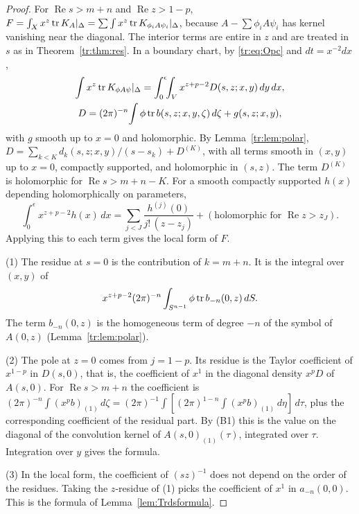 \begin{proof}
For \(\operatorname{Re}s>m+n\) and \(\operatorname{Re}z>1-p\),
\(F=\int_Xx^z\operatorname{tr} K_{A}|_\Delta=\sum\int x^z\operatorname{tr} K_{\phi_iA\psi_i}|_\Delta\),
because \(A-\sum\phi_iA\psi_i\) has kernel vanishing near the diagonal. The
interior terms are entire in \(z\) and are treated in \(s\) as in
Theorem~\ref{tr:thm:res}. In a boundary chart, by \eqref{tr:eq:Opc} and
\(dt=x^{-2}dx\),
\begin{gather*}
 \int x^z\operatorname{tr} K_{\phi A\psi}|_\Delta=\int_0^\epsilon\!\!\int_Vx^{z+p-2}
 D(s,z;x,y)\,dy\,dx,\\
 D=(2\pi)^{-n}\!\int\phi\operatorname{tr} b(s,z;x,y,\zeta)\,d\zeta+g(s,z;x,y),
\end{gather*}
with \(g\) smooth up to \(x=0\) and holomorphic. By
Lemma~\ref{tr:lem:polar}, \(D=\sum_{k<K}d_k(s,z;x,y)/(s-s_k)+D^{(K)}\), with
all terms smooth in \((x,y)\) up to \(x=0\), compactly supported, and
holomorphic in \((s,z)\). The term \(D^{(K)}\) is holomorphic for
\(\operatorname{Re}s>m+n-K\). For a smooth compactly supported \(h(x)\)
depending holomorphically on parameters,
\[
 \int_0^\epsilon x^{z+p-2}h(x)\,dx=\sum_{j<J}\frac{h^{(j)}(0)}{j!\,(z-z_j)}
 +(\text{holomorphic for }\operatorname{Re}z>z_J).
\]
Applying this to each term gives the local form of \(F\).

(1) The residue at \(s=0\) is the contribution of \(k=m+n\). It is the
integral over \((x,y)\) of
\[
 x^{z+p-2}(2\pi)^{-n}\int_{S^{n-1}}\phi\operatorname{tr} b_{-n}(0,z)\,dS .
\]
The term \(b_{-n}(0,z)\) is the homogeneous term of degree \(-n\) of the
symbol of \(A(0,z)\) (Lemma~\ref{tr:lem:polar}).

(2) The pole at \(z=0\) comes from \(j=1-p\). Its residue is the Taylor
coefficient of \(x^{1-p}\) in \(D(s,0)\), that is, the coefficient of
\(x^1\) in the diagonal density \(x^pD\) of \(A(s,0)\). For
\(\operatorname{Re}s>m+n\) the coefficient is
\((2\pi)^{-n}\int(x^pb)_{(1)}\,d\zeta=(2\pi)^{-1}\int[(2\pi)^{1-n}\int
(x^pb)_{(1)}\,d\eta]\,d\tau\), plus the corresponding coefficient of the
residual part. By (B1) this is the value on the diagonal of the convolution
kernel of \(A(s,0)_{(1)}(\tau)\), integrated over \(\tau\). Integration over
\(y\) gives the formula.

(3) In the local form, the coefficient of \((sz)^{-1}\) does not depend on
the order of the residues. Taking the \(z\)-residue of (1) picks the
coefficient of \(x^1\) in \(a_{-n}(0,0)\). This is the formula of
Lemma~\ref{lem:Trdsformula}.
\end{proof}

